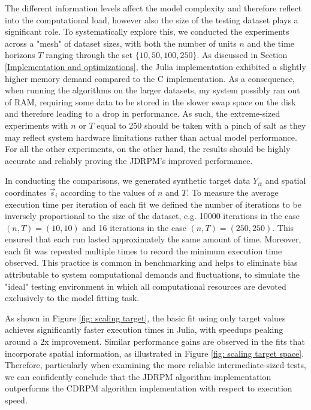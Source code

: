 \documentclass[12pt,	%
	a4paper,		%
	twoside,		%
	openright,		%
	titlepage,%
	]{book}
\theoremstyle{definition}
\begin{document}
The different information levels affect the model complexity and therefore reflect into the computational load, however also the size of the testing dataset plays a significant role. To systematically explore this, we conducted the experiments across a "mesh" of dataset sizes, with both the number of units $n$ and 
the time horizons $T$ ranging through the set $\{10, 50, 100, 250\}$. As discussed in Section \ref{Implementation and optimizations}, the Julia implementation exhibited a slightly higher memory demand compared to the C implementation. As a consequence, when running the algorithms on the larger datasets, my system possibly ran out of RAM, requiring some data to be stored in the slower swap space on the disk and therefore leading to a drop in performance. As such, the extreme-sized experiments with $n$ or $T$ equal to 250 should be taken with a pinch of salt as they may reflect system hardware limitations rather than actual model performance. For all the other experiments, on the other hand, the results should be highly accurate and reliably proving the JDRPM’s improved performance.

In conducting the comparisons, we generated synthetic target data $Y_{it}$ and spatial coordinates $\vec{s}_i$ according to the values of $n$ and $T$. To measure the average execution time per iteration of each fit we defined the number of iterations to be inversely proportional to the size of the dataset, e.g. 10000 iterations in the case $(n,T)=(10,10)$ and 16 iterations in the case $(n,T) = (250,250)$. This ensured that each run lasted approximately the same amount of time. Moreover, each fit was repeated multiple times to record the minimum execution time observed. This practice is common in benchmarking and helps to eliminate bias attributable to system computational demands and fluctuations, to simulate the "ideal" testing environment in which all computational resources are devoted exclusively to the model fitting task.

As shown in Figure \ref{fig: scaling target}, the basic fit using only target values achieves significantly faster execution times in Julia, with speedups peaking around a 2x improvement. Similar performance gains are observed in the fits that incorporate spatial information, as illustrated in Figure \ref{fig: scaling target space}. Therefore, particularly when examining the more reliable intermediate-sized tests, we can confidently conclude that the JDRPM algorithm implementation outperforms the CDRPM algorithm implementation with respect to execution speed.
\end{document}
